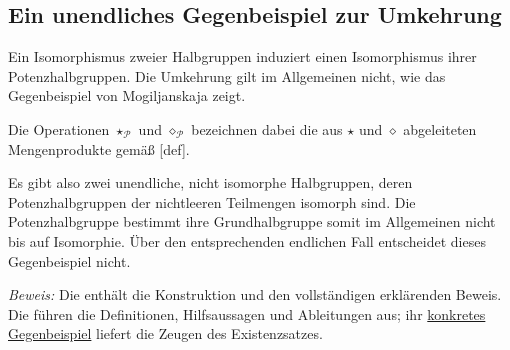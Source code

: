 \subsection{Ein unendliches Gegenbeispiel zur Umkehrung}

Ein Isomorphismus zweier Halbgruppen induziert einen Isomorphismus ihrer
Potenzhalbgruppen. Die Umkehrung gilt im Allgemeinen nicht, wie das
Gegenbeispiel von Mogiljanskaja zeigt.

Die Operationen \(\star_{\mathcal P}\) und \(\diamond_{\mathcal P}\)
bezeichnen dabei die aus \(\star\) und \(\diamond\) abgeleiteten
Mengenprodukte gemäß [def].


Es gibt also zwei unendliche, nicht isomorphe Halbgruppen, deren
Potenzhalbgruppen der nichtleeren Teilmengen isomorph sind. Die
Potenzhalbgruppe bestimmt ihre Grundhalbgruppe somit im Allgemeinen
nicht bis auf Isomorphie. Über den entsprechenden endlichen Fall
entscheidet dieses Gegenbeispiel nicht.

\noindent\emph{Beweis:} Die \MogReadingLink{} enthält die Konstruktion
und den vollständigen erklärenden Beweis. Die \MogProofsLink{} führen
die Definitionen, Hilfsaussagen und Ableitungen aus; ihr
\href{\MogEditionDirectory_B28-mog-proofs.pdf\#mog.statement.MogiljanskajaConstructedPairCounterexample}%
  {konkretes Gegenbeispiel}
liefert die Zeugen des Existenzsatzes.
